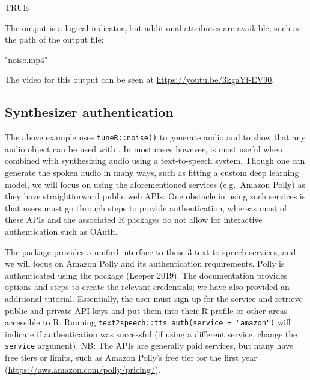 \begin{Schunk}
\begin{Soutput}
[1] TRUE
\end{Soutput}
\end{Schunk}

The output is a logical indicator, but additional attributes are
available, such as the path of the output file:

\begin{Schunk}
\end{Schunk}

\begin{Schunk}
\begin{Soutput}
[1] "noise.mp4"
\end{Soutput}
\end{Schunk}

The video for this output can be seen at
\url{https://youtu.be/3kgaYf-EV90}.

\hypertarget{synthesizer-authentication}{%
\subsection{Synthesizer
authentication}\label{synthesizer-authentication}}

The above example uses \texttt{tuneR::noise()} to generate audio and to
show that any audio object can be used with . In most cases
however,  is most useful when combined with synthesizing audio
using a text-to-speech system. Though one can generate the spoken audio
in many ways, such as fitting a custom deep learning model, we will
focus on using the aforementioned services (e.g.~Amazon Polly) as they
have straightforward public web APIs. One obstacle in using such
services is that users must go through steps to provide authentication,
whereas most of these APIs and the associated R packages do not allow
for interactive authentication such as OAuth.

The  package provides a unified interface to these 3
text-to-speech services, and we will focus on Amazon Polly and its
authentication requirements. Polly is authenticated using the
 package (Leeper 2019). The 
documentation provides options and steps to create the relevant
credentials; we have also provided an additional
\href{http://seankross.com/2017/05/02/Access-Amazon-Web-Services-in-R.html}{tutorial}.
Essentially, the user must sign up for the service and retrieve public
and private API keys and put them into their R profile or other areas
accessible to R. Running
\texttt{text2speech::tts\_auth(service\ =\ "amazon")} will indicate if
authentication was successful (if using a different service, change the
\texttt{service} argument). NB: The APIs are generally paid services,
but many have free tiers or limits, such as Amazon Polly's free tier for
the first year (\url{https://aws.amazon.com/polly/pricing/}).

